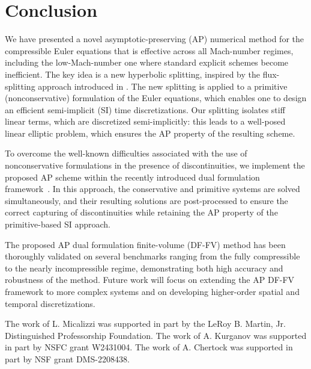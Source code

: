 \documentclass[A4paper,12pt,twoside]{article}
\newenvironment{acknowledgment}{{\flushleft \bf Acknowledgment:}}{}
\numberwithin{equation}{section}
\numberwithin{figure}{section}
\numberwithin{table}{section}
\newcommand{\lore}[1]{{\leavevmode\color{red} #1}}
\begin{document}
\section{Conclusion}\label{sec5}
We have presented a novel asymptotic-preserving (AP) numerical method for the compressible Euler equations that is effective across all
Mach-number regimes, including the low-Mach-number one where standard explicit schemes become inefficient. The key idea is a new hyperbolic
splitting, inspired by the flux-splitting approach introduced in \cite{haack2012all}. The new splitting is applied to a primitive
(nonconservative) formulation of the Euler equations, which enables one to design an efficient semi-implicit (SI) time discretizations. Our
splitting isolates stiff linear terms, which are discretized semi-implicitly: this leads to a well-posed linear elliptic problem, which
\lore{ensures} the AP property of the resulting scheme.
	
To overcome the well-known difficulties associated with the use of nonconservative formulations in the presence of discontinuities, we
implement the proposed AP scheme within the recently introduced dual formulation framework~\cite{CFKM,ACKM}. In this approach, the conservative and primitive
systems are solved simultaneously, and their resulting solutions are post-processed to ensure the correct capturing of discontinuities \lore{while retaining} the AP property of the primitive-based SI approach.
	
The proposed AP dual formulation finite-volume (DF-FV) method has been thoroughly validated on several benchmarks ranging from the fully
compressible to the nearly incompressible regime, demonstrating both high accuracy and robustness of the method. Future work will focus on
extending the AP DF-FV framework to more complex systems and on developing higher-order spatial and %
\lore{temporal} discretizations.
	
\begin{acknowledgment}
The work of L. Micalizzi was supported in part by the LeRoy B. Martin, Jr. Distinguished Professorship Foundation. The work of A. Kurganov
was supported in part by NSFC grant W2431004. The work of A. Chertock was supported in part by NSF grant DMS-2208438. 
\end{acknowledgment}



\end{document}
